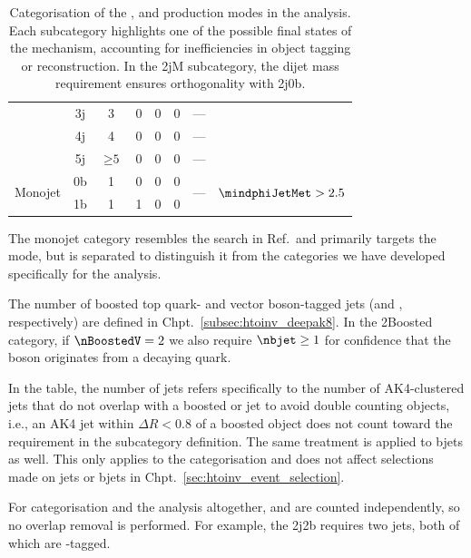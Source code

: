 \begin{table}[htbp]
\begin{tabular}{cccccccc}
        & 3j & 3 & 0 & 0 & 0 & ---\\
        & 4j & 4 & 0 & 0 & 0 & ---\\
        & 5j & $\geq \text{5}$ & 0 & 0 & 0 & ---\\\hline
        \multirow{2}{*}{Monojet}& 0b & 1 & 0 & 0 & 0 & \multirow{2}{*}{---} & \multirow{2}{*}{$\mindphiJetMet > \text{2.5}$}\\ %
        & 1b & 1 & 1 & 0 & 0 &  \\\hline\hline
    \end{tabular}
    \caption[Categorisation of the \ttH, \VH and \ggH production modes in the analysis]{Categorisation of the \ttH, \VH and \ggH production modes in the analysis. Each subcategory highlights one of the possible final states of the mechanism, accounting for inefficiencies in object tagging or reconstruction. In the \ggH 2jM subcategory, the dijet mass requirement ensures orthogonality with \VH 2j0b.}
    \label{tab:htoinv_categories}
\end{table}

The monojet category resembles the search in Ref.~and primarily targets the \ggH mode, but is separated to distinguish it from the categories we have developed specifically for the analysis.

The number of boosted top quark- and vector boson-tagged \glspl{jet} (\nBoostedTop and \nBoostedV, respectively) are defined in Chpt.~\ref{subsec:htoinv_deepak8}. In the \ttH 2Boosted category, if $\nBoostedV = \text{2}$ we also require $\nbjet \geq \text{1}$ for confidence that the \PVec boson originates from a decaying \Ptop quark.

In the table, the number of \glspl{jet} \njet refers specifically to the number of AK4-clustered \glspl{jet} that do not overlap with a boosted \Ptop or \PVec \gls{jet} to avoid double counting objects, i.e., an AK4 \gls{jet} within $\Delta R < \text{0.8}$ of a boosted object does not count toward the \njet requirement in the subcategory definition. The same treatment is applied to \glspl{bjet} as well. This only applies to the categorisation and does not affect selections made on \glspl{jet} or \glspl{bjet} in Chpt.~\ref{sec:htoinv_event_selection}.

For categorisation and the analysis altogether, \njet and \nbjet are counted independently, so no overlap removal is performed. For example, the \VH 2j2b requires two \glspl{jet}, both of which are \Pbottom-tagged.

